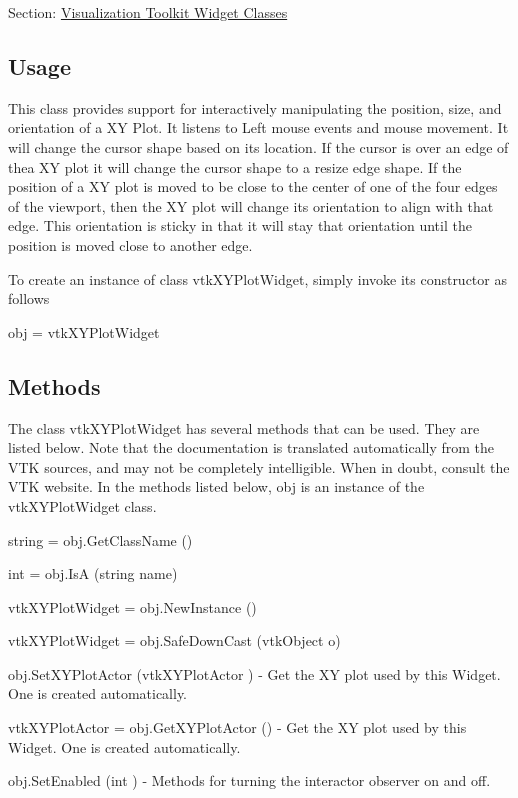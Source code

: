 Section\-: \hyperlink{sec_vtkwidgets}{Visualization Toolkit Widget Classes} \hypertarget{vtkwidgets_vtkxyplotwidget_Usage}{}\subsection{Usage}\label{vtkwidgets_vtkxyplotwidget_Usage}
This class provides support for interactively manipulating the position, size, and orientation of a X\-Y Plot. It listens to Left mouse events and mouse movement. It will change the cursor shape based on its location. If the cursor is over an edge of thea X\-Y plot it will change the cursor shape to a resize edge shape. If the position of a X\-Y plot is moved to be close to the center of one of the four edges of the viewport, then the X\-Y plot will change its orientation to align with that edge. This orientation is sticky in that it will stay that orientation until the position is moved close to another edge.

To create an instance of class vtk\-X\-Y\-Plot\-Widget, simply invoke its constructor as follows \begin{DoxyVerb}  obj = vtkXYPlotWidget
\end{DoxyVerb}
 \hypertarget{vtkwidgets_vtkxyplotwidget_Methods}{}\subsection{Methods}\label{vtkwidgets_vtkxyplotwidget_Methods}
The class vtk\-X\-Y\-Plot\-Widget has several methods that can be used. They are listed below. Note that the documentation is translated automatically from the V\-T\-K sources, and may not be completely intelligible. When in doubt, consult the V\-T\-K website. In the methods listed below, {\ttfamily obj} is an instance of the vtk\-X\-Y\-Plot\-Widget class. 
\begin{DoxyItemize}
\item {\ttfamily string = obj.\-Get\-Class\-Name ()}  
\item {\ttfamily int = obj.\-Is\-A (string name)}  
\item {\ttfamily vtk\-X\-Y\-Plot\-Widget = obj.\-New\-Instance ()}  
\item {\ttfamily vtk\-X\-Y\-Plot\-Widget = obj.\-Safe\-Down\-Cast (vtk\-Object o)}  
\item {\ttfamily obj.\-Set\-X\-Y\-Plot\-Actor (vtk\-X\-Y\-Plot\-Actor )} -\/ Get the X\-Y plot used by this Widget. One is created automatically.  
\item {\ttfamily vtk\-X\-Y\-Plot\-Actor = obj.\-Get\-X\-Y\-Plot\-Actor ()} -\/ Get the X\-Y plot used by this Widget. One is created automatically.  
\item {\ttfamily obj.\-Set\-Enabled (int )} -\/ Methods for turning the interactor observer on and off.  
\end{DoxyItemize}
